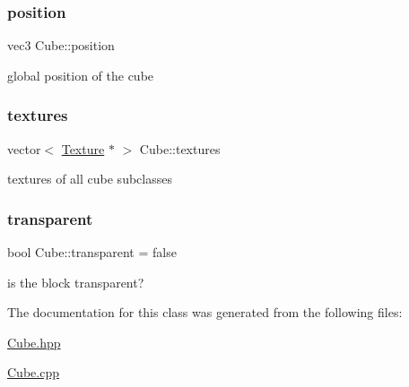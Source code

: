 \mbox{\label{classCube_a9b495ef759214f35fcc7f466ebfa64a9}} 
\subsubsection{\texorpdfstring{position}{position}}
{\footnotesize\ttfamily vec3 Cube\+::position}



global position of the cube 

\mbox{\label{classCube_a7c3516e41ce365ccad2d9bb9ed81ff10}} 
\subsubsection{\texorpdfstring{textures}{textures}}
{\footnotesize\ttfamily vector$<$ \mbox{\hyperlink{classTexture}{Texture}} $\ast$ $>$ Cube\+::textures\hspace{0.3cm}{\ttfamily [static]}}



textures of all cube subclasses 

\mbox{\label{classCube_ac7eda995b98581564cb8dbe3ccc9369d}} 
\subsubsection{\texorpdfstring{transparent}{transparent}}
{\footnotesize\ttfamily bool Cube\+::transparent = false}



is the block transparent? 



The documentation for this class was generated from the following files\+:\begin{DoxyCompactItemize}
\item 
\mbox{\hyperlink{Cube_8hpp}{Cube.\+hpp}}\item 
\mbox{\hyperlink{Cube_8cpp}{Cube.\+cpp}}\end{DoxyCompactItemize}
